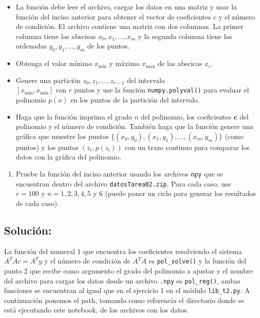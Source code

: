 \documentclass[11pt]{article}
\providecommand{\tightlist}{%
      \setlength{\itemsep}{0pt}\setlength{\parskip}{0pt}}
\begin{document}
\begin{itemize}
\tightlist
\item
  La función debe leer el archivo, cargar los datos en una matriz y usar
  la función del inciso anterior para obtener el vector de coeficientes
  \(c\) y el número de condición. El archivo contiene una matriz con dos
  columnas. La primer columna tiene las abscisas
  \(x_0, x_1, ..., x_{m}\) y la segunda columna tiene las ordenadas
  \(y_0, y_1, ..., y_{m}\) de los puntos.
\item
  Obtenga el valor mínimo \(x_{\min}\) y máximo \(x_{\max}\) de las
  abscicas \(x_i\).\\
\item
  Genere una partición \(z_0, z_1, ..., z_{r-1}\) del intervalo\\
  \([x_{\min}, x_{\min}]\) con \(r\) puntos y use la función
  \texttt{numpy.polyval()} para evaluar el polinomio \(p(x)\) en los
  puntos de la partición del intervalo.
\item
  Haga que la función imprima el grado \(n\) del polinomio, los
  coeficientes \(\mathbf{c}\) del polinomio y el número de condición.
  También haga que la función genere una gráfica que muestre los puntos
  \(\{(x_0, y_0), (x_1, y_1), ..., (x_m, y_m)\}\) (como puntos) y los
  puntos \((z_i, p(z_i))\) con un trazo continuo para comparar los datos
  con la gráfica del polinomio.
\end{itemize}

\begin{enumerate}
\def\labelenumi{\arabic{enumi}.}
\setcounter{enumi}{2}
\tightlist
\item
  Pruebe la función del inciso anterior usando los archivos \texttt{npy}
  que se encuentran dentro del archivo \texttt{datosTarea02.zip}. Para
  cada caso, use \(r=100\) y \(n=1,2,3,4,5\) y \(6\) (puede poner un
  ciclo para generar los resultados de cada caso).
\end{enumerate}

\hypertarget{soluciuxf3n}{%
\subsection{Solución:}\label{soluciuxf3n}}

    La función del numeral 1 que encuentra los coeficientes resolviendo el
sistema \(A^TAc=A^Ty\) y el número de condición de \(A^TA\) es
\texttt{pol\_solve()} y la función del punto 2 que recibe como argumento
el grado del polinomio a ajustar y el nombre del archivo para cargar los
datos desde un archivo \texttt{.npy} es \texttt{pol\_reg()}, ambas
funciones se encuentran al igual que en el ejercicio 1 en el módulo
\texttt{lib\_t2.py}. A continuación ponemos el path, tomando como
referencia el directorio donde se está ejecutando este notebook, de los
archivos con los datos.
\end{document}
